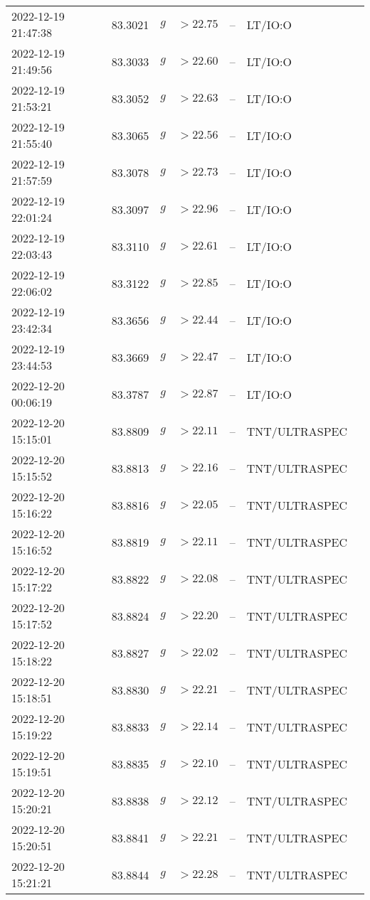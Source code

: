 \documentclass{nature_plusfigure}
\begin{document}
\begin{supplement}
\begin{center}
\begin{longtable}{lllllll}
2022-12-19 21:47:38 & 83.3021 & $g$ & $>22.75$ & -- & LT/IO:O &  \\ 
2022-12-19 21:49:56 & 83.3033 & $g$ & $>22.60$ & -- & LT/IO:O &  \\ 
2022-12-19 21:53:21 & 83.3052 & $g$ & $>22.63$ & -- & LT/IO:O &  \\ 
2022-12-19 21:55:40 & 83.3065 & $g$ & $>22.56$ & -- & LT/IO:O &  \\ 
2022-12-19 21:57:59 & 83.3078 & $g$ & $>22.73$ & -- & LT/IO:O &  \\ 
2022-12-19 22:01:24 & 83.3097 & $g$ & $>22.96$ & -- & LT/IO:O &  \\ 
2022-12-19 22:03:43 & 83.3110 & $g$ & $>22.61$ & -- & LT/IO:O &  \\ 
2022-12-19 22:06:02 & 83.3122 & $g$ & $>22.85$ & -- & LT/IO:O &  \\ 
2022-12-19 23:42:34 & 83.3656 & $g$ & $>22.44$ & -- & LT/IO:O &  \\ 
2022-12-19 23:44:53 & 83.3669 & $g$ & $>22.47$ & -- & LT/IO:O &  \\ 
2022-12-20 00:06:19 & 83.3787 & $g$ & $>22.87$ & -- & LT/IO:O &  \\ 
2022-12-20 15:15:01 & 83.8809 & $g$ & $>22.11$ & -- & TNT/ULTRASPEC &  \\ 
2022-12-20 15:15:52 & 83.8813 & $g$ & $>22.16$ & -- & TNT/ULTRASPEC &  \\ 
2022-12-20 15:16:22 & 83.8816 & $g$ & $>22.05$ & -- & TNT/ULTRASPEC &  \\ 
2022-12-20 15:16:52 & 83.8819 & $g$ & $>22.11$ & -- & TNT/ULTRASPEC &  \\ 
2022-12-20 15:17:22 & 83.8822 & $g$ & $>22.08$ & -- & TNT/ULTRASPEC &  \\ 
2022-12-20 15:17:52 & 83.8824 & $g$ & $>22.20$ & -- & TNT/ULTRASPEC &  \\ 
2022-12-20 15:18:22 & 83.8827 & $g$ & $>22.02$ & -- & TNT/ULTRASPEC &  \\ 
2022-12-20 15:18:51 & 83.8830 & $g$ & $>22.21$ & -- & TNT/ULTRASPEC &  \\ 
2022-12-20 15:19:22 & 83.8833 & $g$ & $>22.14$ & -- & TNT/ULTRASPEC &  \\ 
2022-12-20 15:19:51 & 83.8835 & $g$ & $>22.10$ & -- & TNT/ULTRASPEC &  \\ 
2022-12-20 15:20:21 & 83.8838 & $g$ & $>22.12$ & -- & TNT/ULTRASPEC &  \\ 
2022-12-20 15:20:51 & 83.8841 & $g$ & $>22.21$ & -- & TNT/ULTRASPEC &  \\ 
2022-12-20 15:21:21 & 83.8844 & $g$ & $>22.28$ & -- & TNT/ULTRASPEC &  \\ 

\end{longtable}
\end{center}
\end{supplement}
\end{document}
